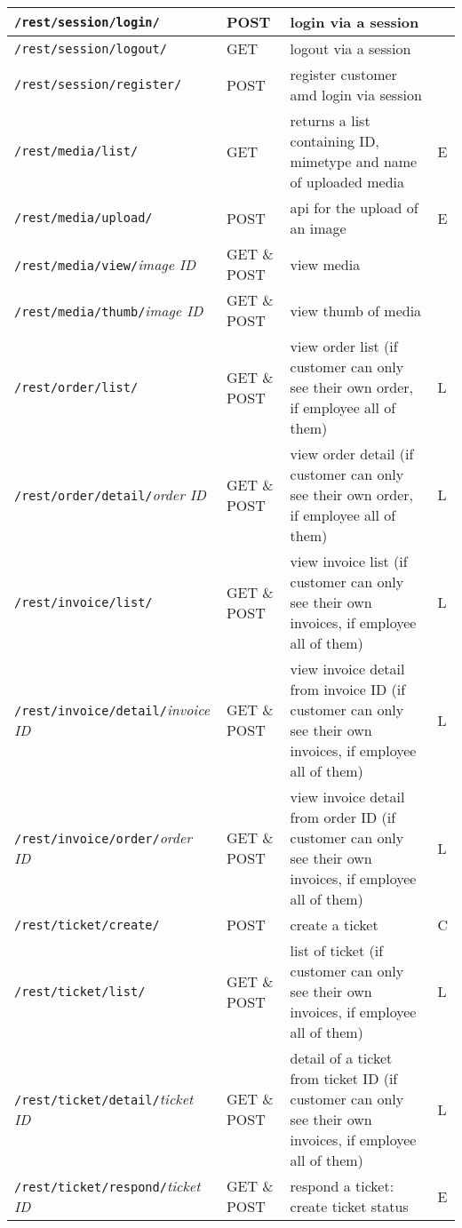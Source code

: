 \begin{longtable}{|p{}|p{} |p{}|p{}|}

\texttt{/rest/session/login/} & POST & login via a session &  \\\hline
\texttt{/rest/session/logout/} & GET & logout via a session &  \\\hline


\texttt{/rest/session/register/} & POST & register customer amd login via session &  \\\hline
\texttt{/rest/media/list/} & GET & returns a list containing ID, mimetype and name of uploaded media & E\\\hline
\texttt{/rest/media/upload/} & POST &  api for the upload of an image & E\\\hline
\texttt{/rest/media/view/}\textit{image ID} & GET \& POST &  view media &  \\\hline
\texttt{/rest/media/thumb/}\textit{image ID} & GET \& POST & view thumb of media &  \\\hline


\texttt{/rest/order/list/} & GET \& POST & view order list (if customer can only see their own order, if employee all of them) & L\\\hline
\texttt{/rest/order/detail/}\textit{order ID} & GET \& POST & view order detail (if customer can only see their own order, if employee all of them) & L\\\hline


\texttt{/rest/invoice/list/} & GET \& POST & view invoice list (if customer can only see their own invoices, if employee all of them) & L\\\hline
\texttt{/rest/invoice/detail/}\textit{invoice ID} & GET \& POST & view invoice detail from invoice ID (if customer can only see their own invoices, if employee all of them) & L\\\hline
\texttt{/rest/invoice/order/}\textit{order ID} & GET \& POST & view invoice detail from order ID (if customer can only see their own invoices, if employee all of them) & L\\\hline


\texttt{/rest/ticket/create/} & POST  & create a ticket & C \\\hline
\texttt{/rest/ticket/list/} & GET \& POST  & list of ticket (if customer can only see their own invoices, if employee all of them) & L \\\hline
\texttt{/rest/ticket/detail/}\textit{ticket ID} & GET \& POST & detail of a ticket from ticket ID (if customer can only see their own invoices, if employee all of them) & L \\\hline
\texttt{/rest/ticket/respond/}\textit{ticket ID} & GET \& POST & respond a ticket: create ticket status & E \\\hline


\end{longtable}
